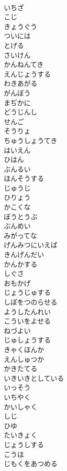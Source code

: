 \documentclass[8pt]{extreport}
\begin{document}
\begin{CJK}{UTF8}{min}
\\	いちざ
\\	こじ
\\	きょうぐう
\\	ついには
\\	とげる
\\	さいけん
\\	かんねんてき
\\	えんじょうする
\\	わきあがる
\\	がんぼう
\\	まぢかに
\\	どうじんし
\\	せんご
\\	そうりょ
\\	ちゅうしょうてき
\\	はいえん
\\	ひはん
\\	ぶんるい
\\	ほんそうする
\\	じゅうじ
\\	ひりょう
\\	かこくな
\\	ぼうとうぶ
\\	ぶんめい
\\	みがってな
\\	げんみつにいえば
\\	きんげんだい
\\	かんかする
\\	しぐさ
\\	おもかげ
\\	じょうじゅする
\\	しぼをつのらせる
\\	ようしたんれい
\\	こういをよせる
\\	ねづよい
\\	じゅしょうする
\\	きゃくほんか
\\	えんしゅつか
\\	かきたてる
\\	いきいきとしている
\\	いっそう
\\	いちやく
\\	かいしゃく
\\	しじ
\\	ひゆ
\\	たいきょく
\\	じょうしする
\\	こうほ
\\	じもくをあつめる

\end{CJK}
\end{document}
